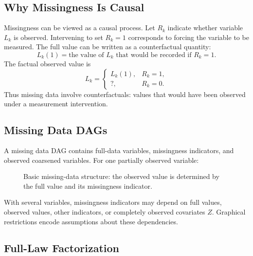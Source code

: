 \label{lec:9-10}

\subsection{Why Missingness Is Causal}

Missingness can be viewed as a causal process. Let $R_k$ indicate whether
variable $L_k$ is observed. Intervening to set $R_k=1$ corresponds to forcing the
variable to be measured. The full value can be written as a counterfactual
quantity:
\[
  L_k(1)=\text{the value of }L_k\text{ that would be recorded if }R_k=1.
\]
The factual observed value is
\[
  L_k=
  \begin{cases}
  L_k(1), & R_k=1,\\
  ?, & R_k=0.
  \end{cases}
\]
Thus missing data involve counterfactuals: values that would have been observed
under a measurement intervention.

\subsection{Missing Data DAGs}

A missing data DAG contains full-data variables, missingness indicators, and
observed coarsened variables. For one partially observed variable:

\begin{figure}[H]
\centering
{}
\caption{Basic missing-data structure: the observed value is determined by the full value and its missingness indicator.}
\label{fig:ch9-basic-missing-dag}
\end{figure}

With several variables, missingness indicators may depend on full values,
observed values, other indicators, or completely observed covariates $Z$.
Graphical restrictions encode assumptions about these dependencies.

\subsection{Full-Law Factorization}

